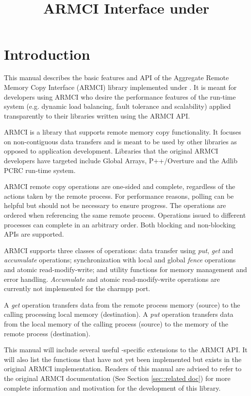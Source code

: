 \documentclass[10pt]{article}
\title{ARMCI Interface under \charmpp{}}
\begin{document}
\maketitle

\section{Introduction}
\label{sec::introduction}

This manual describes the basic features and API of the Aggregate
Remote Memory Copy Interface (ARMCI) library implemented under
\charmpp{}. It is meant for developers using ARMCI who desire the
performance features of the \charmpp{} run-time system (e.g. dynamic
load balancing, fault tolerance and scalability) applied transparently
to their libraries written using the ARMCI API.

ARMCI is a library that supports remote memory copy functionality. It
focuses on non-contiguous data transfers and is meant to be used by
other libraries as opposed to application development. Libraries that
the original ARMCI developers have targeted include Global Arrays,
P++/Overture and the Adlib PCRC run-time system.

ARMCI remote copy operations are one-sided and complete, regardless of
the actions taken by the remote process. For performance reasons,
polling can be helpful but should not be necessary to ensure
progress. The operations are ordered when referencing the same remote
process. Operations issued to different processes can complete in an
arbitrary order. Both blocking and non-blocking APIs are supported.

ARMCI supports three classes of operations: data transfer using {\em
put}, {\em get} and {\em accumulate} operations; synchronization with
local and global {\em fence} operations and atomic read-modify-write;
and utility functions for memory management and error handling. {\em
Accumulate} and atomic read-modify-write operations are currently not
implemented for the charmpp{} port.

A {\em get} operation transfers data from the remote process memory
(source) to the calling processing local memory (destination). A {\em
put} operation transfers data from the local memory of the calling
process (source) to the memory of the remote process (destination).

This manual will include several useful \charmpp{}-specific extensions to
the ARMCI API. It will also list the functions that have not yet been
implemented but exists in the original ARMCI implementation. Readers
of this manual are advised to refer to the original ARMCI
documentation (See Section \ref{sec::related doc}) for more complete
information and motivation for the development of this library.
\end{document}
